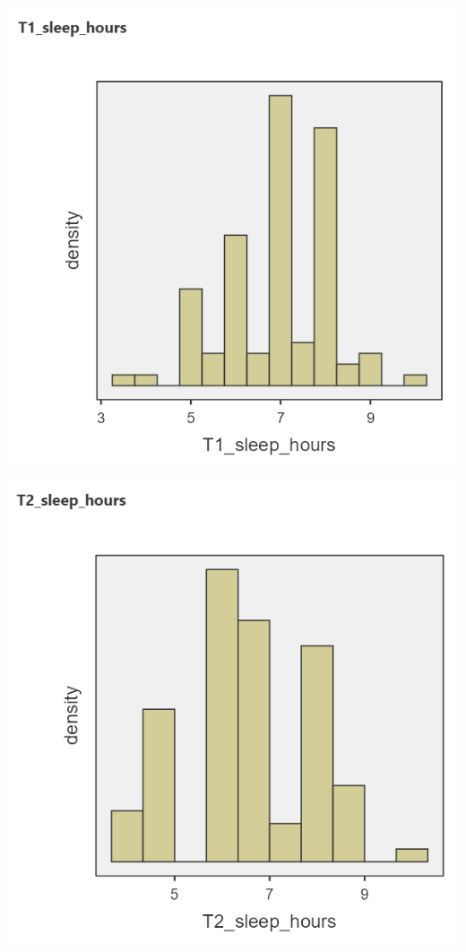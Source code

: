 \documentclass[
]{book}
\begin{document}
\includegraphics{img/T1_SleepHours_Histogram.png}

\includegraphics{img/T2_SleepHours_Histogram.png}
\end{document}

